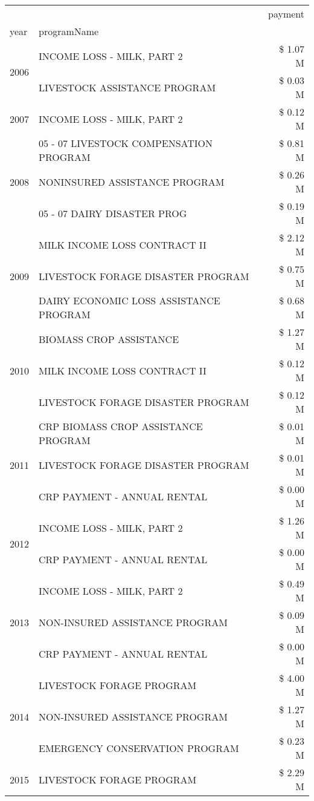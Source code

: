 \begin{tabular}{llr}
\toprule
 &  & payment \\
year & programName &  \\
\midrule
\multirow[t]{2}{*}{2006} & INCOME LOSS - MILK, PART 2 & \$ 1.07 M \\
 & LIVESTOCK ASSISTANCE PROGRAM & \$ 0.03 M \\
\cline{1-3}
2007 & INCOME LOSS - MILK, PART 2 & \$ 0.12 M \\
\cline{1-3}
\multirow[t]{3}{*}{2008} & 05 - 07 LIVESTOCK COMPENSATION PROGRAM & \$ 0.81 M \\
 & NONINSURED ASSISTANCE PROGRAM & \$ 0.26 M \\
 & 05 - 07 DAIRY DISASTER PROG & \$ 0.19 M \\
\cline{1-3}
\multirow[t]{3}{*}{2009} & MILK INCOME LOSS CONTRACT II & \$ 2.12 M \\
 & LIVESTOCK FORAGE DISASTER  PROGRAM & \$ 0.75 M \\
 & DAIRY ECONOMIC LOSS ASSISTANCE PROGRAM & \$ 0.68 M \\
\cline{1-3}
\multirow[t]{3}{*}{2010} & BIOMASS CROP ASSISTANCE & \$ 1.27 M \\
 & MILK INCOME LOSS CONTRACT II & \$ 0.12 M \\
 & LIVESTOCK FORAGE DISASTER  PROGRAM & \$ 0.12 M \\
\cline{1-3}
\multirow[t]{3}{*}{2011} & CRP BIOMASS CROP ASSISTANCE PROGRAM & \$ 0.01 M \\
 & LIVESTOCK FORAGE DISASTER PROGRAM & \$ 0.01 M \\
 & CRP PAYMENT - ANNUAL RENTAL & \$ 0.00 M \\
\cline{1-3}
\multirow[t]{2}{*}{2012} & INCOME LOSS - MILK, PART 2 & \$ 1.26 M \\
 & CRP PAYMENT - ANNUAL RENTAL & \$ 0.00 M \\
\cline{1-3}
\multirow[t]{3}{*}{2013} & INCOME LOSS - MILK, PART 2 & \$ 0.49 M \\
 & NON-INSURED ASSISTANCE PROGRAM & \$ 0.09 M \\
 & CRP PAYMENT - ANNUAL RENTAL & \$ 0.00 M \\
\cline{1-3}
\multirow[t]{3}{*}{2014} & LIVESTOCK FORAGE PROGRAM & \$ 4.00 M \\
 & NON-INSURED ASSISTANCE PROGRAM & \$ 1.27 M \\
 & EMERGENCY CONSERVATION PROGRAM & \$ 0.23 M \\
\cline{1-3}
\multirow[t]{3}{*}{2015} & LIVESTOCK FORAGE PROGRAM & \$ 2.29 M \\

\end{tabular}
